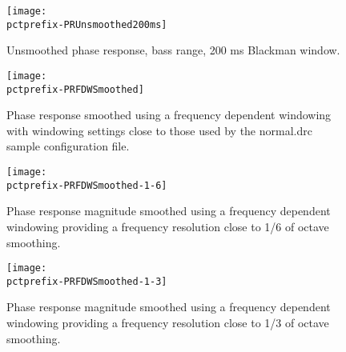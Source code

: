 \documentclass[a4paper,titlepage]{article}
\newcommand{\pctprefix}{T}
\newcommand{\pctwidth}{1.0}
\begin{document}
\clearpage

\begin{figure}
\begin{minipage}{\textwidth}
\begin{center}
\texttt{[image: \\pctprefix-PRUnsmoothed200ms]}
\caption{Unsmoothed phase response, bass range, 200 ms Blackman window.}
\end{center}
\end{minipage}

\begin{minipage}{\textwidth}
\begin{center}
\texttt{[image: \\pctprefix-PRFDWSmoothed]}
\caption{Phase response  smoothed using a frequency  dependent windowing
with windowing  settings close  to those  used by the  normal.drc sample
configuration file.}
\end{center}
\end{minipage}
\end{figure}

\clearpage

\begin{figure}
\begin{minipage}{\textwidth}
\begin{center}
\texttt{[image: \\pctprefix-PRFDWSmoothed-1-6]}
\caption{Phase response  magnitude smoothed using  a frequency dependent
windowing  providing  a  frequency  resolution  close  to 1/6  of octave
smoothing.}
\end{center}
\end{minipage}

\begin{minipage}{\textwidth}
\begin{center}
\texttt{[image: \\pctprefix-PRFDWSmoothed-1-3]}
\caption{Phase response  magnitude smoothed using  a frequency dependent
windowing  providing  a  frequency  resolution  close  to 1/3  of octave
smoothing.}
\end{center}
\end{minipage}
\end{figure}

\clearpage

\end{document}

